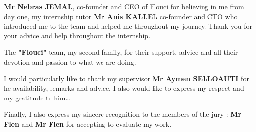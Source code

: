 \textbf{Mr Nebras JEMAL}, co-founder and CEO of Flouci for believing in me from day one, my internship tutor \textbf{Mr Anis KALLEL} co-founder and CTO who introduced me to the team and helped me throughout my journey. Thank you for your advice and help throughout the internship. \newline

The \textbf{"Flouci"} team, my second family, for their support, advice and all their devotion and passion to what we are doing.\newline

I would particularly like to thank my supervisor \textbf{Mr Aymen SELLOAUTI} for he availability, remarks and advice. I also would like to express my respect and my gratitude to him\dots\newline

Finally, I also express my sincere recognition to the members of the jury : \textbf{Mr Flen} and \textbf{Mr Flen} for accepting to evaluate my work.